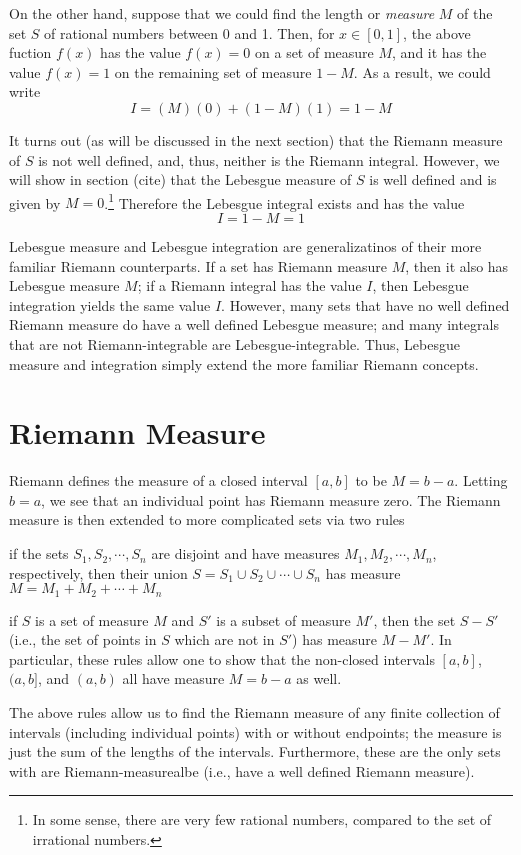 On the other hand, suppose that we could find the length or \emph{measure} $M$ of the set $S$ of rational numbers between 0 and 1.  Then, for $x \in [0, 1]$, the above fuction $f(x)$ has the value $f(x) = 0$ on a set of measure $M$, and it has the value $f(x) = 1$ on the remaining set of measure $1 - M$.  As a result, we could write
%
\begin{equation*}
  I = (M)(0) + (1-M)(1) = 1 - M
\end{equation*}
%

It turns out (as will be discussed in the next section) that the Riemann measure of $S$ is not well defined, and, thus, neither is the Riemann integral.  However, we will show in section (cite) that the Lebesgue measure of $S$ is well defined and is given by $M = 0$.\footnote{In some sense, there are very few rational numbers, compared to the set of irrational numbers.}  Therefore the Lebesgue integral exists and has the value
%
\begin{equation*}
  I = 1 - M = 1
\end{equation*}
%

Lebesgue measure and Lebesgue integration are generalizatinos of their more familiar Riemann counterparts.  If a set has Riemann measure $M$, then it also has Lebesgue measure $M$; if a Riemann integral has the value $I$, then Lebesgue integration yields the same value $I$.  However, many sets that have no well defined Riemann measure do have a well defined Lebesgue measure; and many integrals that are not Riemann-integrable are Lebesgue-integrable.  Thus, Lebesgue measure and integration simply extend the more familiar Riemann concepts.
%
\section{Riemann Measure}
%
Riemann defines the measure of a closed interval $[a, b]$ to be $M = b - a$.  Letting $b = a$, we see that an individual point has Riemann measure zero.  The Riemann measure is then extended to more complicated sets via two rules
\begin{enumerate*}
\item if the sets $S_1, S_2, \cdots, S_n$ are disjoint and have measures $M_1, M_2, \cdots, M_n$, respectively, then their union $S = S_1 \cup S_2 \cup \cdots \cup S_n$ has measure $M = M_1 + M_2 + \cdots + M_n$
\item if $S$ is a set of measure $M$ and $S'$ is a subset of measure $M\prime$, then the set $S - S'$ (i.e., the set of points in $S$ which are not in $S'$) has measure $M - M'$.  In particular, these rules allow one to show that the non-closed intervals $[a, b]$, $(a, b]$, and $(a, b)$ all have measure $M = b - a$ as well.
\end{enumerate*}
The above rules allow us to find the Riemann measure of any finite collection of intervals (including individual points) with or without endpoints; the measure is just the sum of the lengths of the intervals.  Furthermore, these are the only sets with are Riemann-measurealbe (i.e., have a well defined Riemann measure).